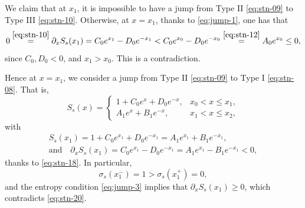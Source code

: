 \documentclass[12pt]{article}
\theoremstyle{definition}
\theoremstyle{remark}
\newcommand{\dx}{\partial_x}
\numberwithin{equation}{section}
\begin{document}
\smallskip 

We claim that at $ x_1 $, it is impossible to have a jump from Type II \eqref{eq:stn-09} to Type III \eqref{eq:stn-10}. Otherwise, at $ x = x_1 $, thanks to \eqref{eq:jump-1}, one has that 
\begin{equation}
    \label{eq:stn-18}
    0 \overset{\eqref{eq:stn-10}}{=} \dx S_s(x_1) = C_0 e^{x_1} - D_0 e^{-x_1} < C_0 e^{x_0} - D_0 e^{-x_0} \overset{\eqref{eq:stn-12}}{=} A_0 e^{x_0} \leq 0,
\end{equation}
since $ C_0, D_0 <0 $, and $ x_1 > x_0 $. This is a contradiction. 

\smallskip 

Hence at $ x = x_1 $, we consider a jump from Type II \eqref{eq:stn-09} to Type I \eqref{eq:stn-08}. That is, 
\begin{equation}
    \label{eq:stn-19}
    S_s(x) = \begin{cases}
        1 + C_0 e^x + D_0 e^{-x}, & x_0 < x \leq x_1, \\
        A_1 e^{x} + B_1 e^{-x}, & x_1 < x \leq x_2, 
    \end{cases}
\end{equation}
with 
\begin{equation}
    \label{eq:stn-20}
    \begin{gathered}
    S_s(x_1) = 1 + C_0 e^{x_1} + D_0 e^{-x_1} =  A_1 e^{x_1} + B_1 e^{-x_1}, \quad \\
    \text{and} \quad \dx S_s(x_1) = C_0 e^{x_1} - D_0 e^{-x_1} =  A_1 e^{x_1} - B_1 e^{-x_1} < 0,
    \end{gathered}
\end{equation}
thanks to \eqref{eq:stn-18}.
In particular, 
\begin{equation}
    \label{eq:stn-21}
    \sigma_s(x_1^-) = 1 > \sigma_s(x_1^+) = 0,
\end{equation}
and the entropy condition \eqref{eq:jump-3} implies that $ \dx S_s(x_1) \geq 0 $, which contradicts \eqref{eq:stn-20}.

\smallskip
\end{document}
